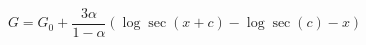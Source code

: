 \begin{equation}\label{SG}
    G = G_{0}  + \frac{3\alpha}{1-
    \alpha}(\log \sec (x+c) - \log \sec (c)-x)
\end{equation}

